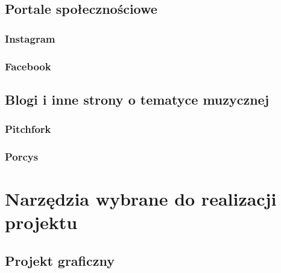 \documentclass[12pt]{article}
\numberwithin{figure}{section}
\begin{document}
\begin{sloppypar}
\subsubsection{}


\subsection{Portale społecznościowe}


\subsubsection{Instagram}


\subsubsection{Facebook}


\subsection{Blogi i inne strony o tematyce muzycznej}


\subsubsection{Pitchfork}


\subsubsection{Porcys}


\newpage 

\section{Narzędzia wybrane do realizacji projektu}


\subsection{Projekt graficzny}


\end{sloppypar}
\end{document}
